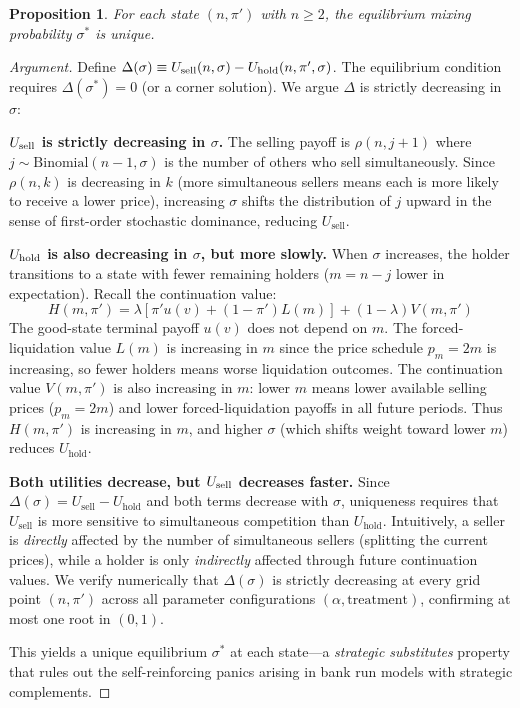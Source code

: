 \documentclass[11pt]{article}
\newtheorem{proposition}{Proposition}
\begin{document}
\begin{proposition}
For each state $(n, \pi')$ with $n \geq 2$, the equilibrium mixing probability
$\sigma^*$ is unique.
\end{proposition}

\begin{proof}[Argument]
Define $\Delta(\sigma) \equiv U_{\textup{sell}}(n, \sigma)
- U_{\textup{hold}}(n, \pi', \sigma)$. The equilibrium condition requires
$\Delta(\sigma^*) = 0$ (or a corner solution). We argue $\Delta$ is strictly
decreasing in $\sigma$:

\textbf{$U_{\textup{sell}}$ is strictly decreasing in $\sigma$.} The selling
payoff is $\rho(n, j{+}1)$ where $j \sim \text{Binomial}(n{-}1, \sigma)$ is
the number of others who sell simultaneously. Since $\rho(n, k)$ is decreasing
in $k$ (more simultaneous sellers means each is more likely to receive a lower
price), increasing $\sigma$ shifts the distribution of $j$ upward in the sense
of first-order stochastic dominance, reducing $U_{\text{sell}}$.

\textbf{$U_{\textup{hold}}$ is also decreasing in $\sigma$, but more slowly.}
When $\sigma$ increases, the holder transitions to a state with fewer remaining
holders ($m = n - j$ lower in expectation). Recall the continuation value:
\[
    H(m, \pi') = \lambda[\pi' u(v) + (1-\pi')L(m)] + (1-\lambda)V(m, \pi')
\]
The good-state terminal payoff $u(v)$ does not depend on $m$. The
forced-liquidation value $L(m)$ is increasing in $m$ since the price schedule
$p_m = 2m$ is increasing, so fewer holders means worse liquidation outcomes.
The continuation value $V(m, \pi')$ is also increasing in $m$: lower $m$ means
lower available selling prices ($p_m = 2m$) and lower forced-liquidation
payoffs in all future periods. Thus $H(m, \pi')$ is increasing in $m$, and
higher $\sigma$ (which shifts weight toward lower $m$) reduces
$U_{\text{hold}}$.

\textbf{Both utilities decrease, but $U_{\textup{sell}}$ decreases faster.}
Since $\Delta(\sigma) = U_{\text{sell}} - U_{\text{hold}}$ and both terms
decrease with $\sigma$, uniqueness requires that $U_{\text{sell}}$ is more
sensitive to simultaneous competition than $U_{\text{hold}}$. Intuitively, a
seller is \textit{directly} affected by the number of simultaneous sellers
(splitting the current prices), while a holder is only \textit{indirectly}
affected through future continuation values. We verify numerically that
$\Delta(\sigma)$ is strictly decreasing at every grid point $(n, \pi')$ across
all parameter configurations $(\alpha, \text{treatment})$, confirming at most
one root in $(0,1)$.

This yields a unique equilibrium $\sigma^*$ at each state---a
\textit{strategic substitutes} property that rules out the self-reinforcing
panics arising in bank run models with strategic complements.
\end{proof}
\end{document}
